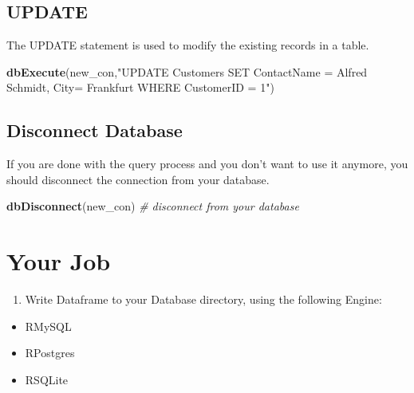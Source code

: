\documentclass[
]{book}
\newenvironment{Shaded}{\begin{snugshade}}{\end{snugshade}}
\newcommand{\CommentTok}[1]{\textcolor[rgb]{0.56,0.35,0.01}{\textit{#1}}}
\newcommand{\FunctionTok}[1]{\textcolor[rgb]{0.13,0.29,0.53}{\textbf{#1}}}
\newcommand{\NormalTok}[1]{#1}
\newcommand{\StringTok}[1]{\textcolor[rgb]{0.31,0.60,0.02}{#1}}
\providecommand{\tightlist}{%
  \setlength{\itemsep}{0pt}\setlength{\parskip}{0pt}}
\begin{document}
\hypertarget{update}{%
\subsection{UPDATE}\label{update}}

The UPDATE statement is used to modify the existing records in a table.

\begin{Shaded}
\begin{Highlighting}[]
\FunctionTok{dbExecute}\NormalTok{(new\_con,}\StringTok{"UPDATE Customers}
\StringTok{                   SET ContactName = \textquotesingle{}Alfred Schmidt\textquotesingle{}, City= \textquotesingle{}Frankfurt\textquotesingle{}}
\StringTok{                   WHERE CustomerID = 1"}\NormalTok{)}
\end{Highlighting}
\end{Shaded}

\hypertarget{disconnect-database}{%
\subsection{Disconnect Database}\label{disconnect-database}}

If you are done with the query process and you don't want to use it anymore, you should disconnect the connection from your database.

\begin{Shaded}
\begin{Highlighting}[]
\FunctionTok{dbDisconnect}\NormalTok{(new\_con)                                        }\CommentTok{\# disconnect from your database}
\end{Highlighting}
\end{Shaded}

\hypertarget{your-job}{%
\section{Your Job}\label{your-job}}

\begin{enumerate}
\def\labelenumi{\arabic{enumi}.}
\tightlist
\item
  Write Dataframe to your Database directory, using the following Engine:
\end{enumerate}

\begin{itemize}
\tightlist
\item
  RMySQL
\item
  RPostgres\\
\item
  RSQLite
\end{itemize}
\end{document}
